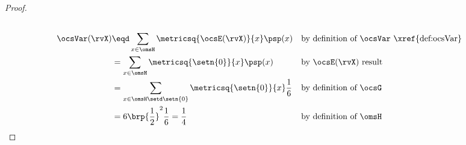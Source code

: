 \begin{tabstr}{0.75}
\begin{proof}
\begin{align*}
  \\
  \ocsVar(\rvX)
    &\eqd \sum_{x\in\omsH}\metricsq{\ocsE(\rvX)}{x}\psp(x)
    && \text{by definition of $\ocsVar$ \xref{def:ocsVar}}
  \\&= \sum_{x\in\omsH}\metricsq{\setn{0}}{x}\psp(x)
    && \text{by $\ocsE(\rvX)$ result}
  \\&= \sum_{x\in\omsH\setd\setn{0}}\metricsq{\setn{0}}{x}\frac{1}{6}
    && \text{by definition of $\ocsG$}
  \\&= 6 \brp{\frac{1}{2}}^2 \frac{1}{6} = \frac{1}{4}
    && \text{by definition of $\omsH$}
\end{align*}
\end{proof}




\end{tabstr}
